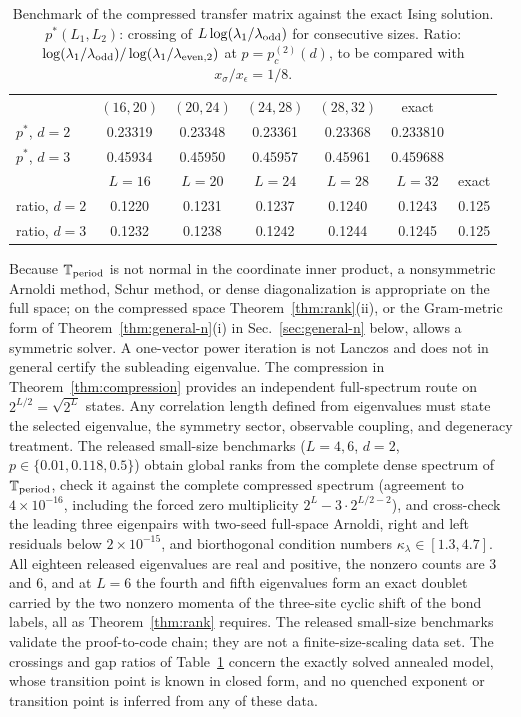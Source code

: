 \documentclass[aps,prx,reprint,superscriptaddress,nobibnotes,longbibliography]{revtex4-2}
\theoremstyle{remark}
\newcommand{\Tper}{\mathbb T_{\rm period}}
\begin{document}
\begin{table}[t]
\caption{Benchmark of the compressed transfer matrix against the exact Ising solution.  $p^*(L_1,L_2)$: crossing of $L\log(\lambda_1/\lambda_{\rm odd})$ for consecutive sizes.  Ratio: $\log(\lambda_1/\lambda_{\rm odd})/\log(\lambda_1/\lambda_{{\rm even},2})$ at $p=p_c^{(2)}(d)$, to be compared with $x_\sigma/x_\epsilon=1/8$.}
\label{tab:benchmark}
\begin{ruledtabular}
\begin{tabular}{lcccccc}
 & $(16,20)$ & $(20,24)$ & $(24,28)$ & $(28,32)$ & exact & \\
\colrule
$p^*$, $d=2$ & 0.23319 & 0.23348 & 0.23361 & 0.23368 & 0.233810 & \\
$p^*$, $d=3$ & 0.45934 & 0.45950 & 0.45957 & 0.45961 & 0.459688 & \\
\colrule
 & $L=16$ & $L=20$ & $L=24$ & $L=28$ & $L=32$ & exact \\
\colrule
ratio, $d=2$ & 0.1220 & 0.1231 & 0.1237 & 0.1240 & 0.1243 & 0.125 \\
ratio, $d=3$ & 0.1232 & 0.1238 & 0.1242 & 0.1244 & 0.1245 & 0.125 \\
\end{tabular}
\end{ruledtabular}
\end{table}

Because $\Tper$ is not normal in the coordinate inner product, a nonsymmetric Arnoldi method, Schur method, or dense diagonalization is appropriate on the full space; on the compressed space Theorem~\ref{thm:rank}(ii), or the Gram-metric form of Theorem~\ref{thm:general-n}(i) in Sec.~\ref{sec:general-n} below, allows a symmetric solver.  A one-vector power iteration is not Lanczos and does not in general certify the subleading eigenvalue.  The compression in Theorem~\ref{thm:compression} provides an independent full-spectrum route on $2^{L/2}=\sqrt{2^L}$ states.  Any correlation length defined from eigenvalues must state the selected eigenvalue, the symmetry sector, observable coupling, and degeneracy treatment.  The released small-size benchmarks ($L=4,6$, $d=2$, $p\in\{0.01,0.118,0.5\}$) obtain global ranks from the complete dense spectrum of $\Tper$, check it against the complete compressed spectrum (agreement to $4\times10^{-16}$, including the forced zero multiplicity $2^L-3\cdot2^{L/2-2}$), and cross-check the leading three eigenpairs with two-seed full-space Arnoldi, right and left residuals below $2\times10^{-15}$, and biorthogonal condition numbers $\kappa_\lambda\in[1.3,4.7]$.  All eighteen released eigenvalues are real and positive, the nonzero counts are $3$ and $6$, and at $L=6$ the fourth and fifth eigenvalues form an exact doublet carried by the two nonzero momenta of the three-site cyclic shift of the bond labels, all as Theorem~\ref{thm:rank} requires.  The released small-size benchmarks validate the proof-to-code chain; they are not a finite-size-scaling data set.  The crossings and gap ratios of Table~\ref{tab:benchmark} concern the exactly solved annealed model, whose transition point is known in closed form, and no quenched exponent or transition point is inferred from any of these data.
\end{document}
